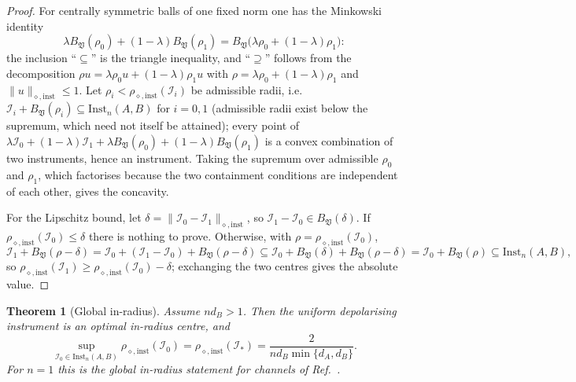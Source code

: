 \documentclass[11pt,a4paper]{article}
\newtheorem{theorem}{Theorem}[section]
\newcommand{\Inst}{\mathrm{Inst}}
\begin{document}
\begin{proof}
For centrally symmetric balls of one fixed norm one has the Minkowski identity
\[
\lambda B_{\mathfrak V}(\rho_0)+(1-\lambda)B_{\mathfrak V}(\rho_1)
=B_{\mathfrak V}\big(\lambda\rho_0+(1-\lambda)\rho_1\big):
\]
the inclusion ``$\subseteq$'' is the triangle inequality, and ``$\supseteq$'' follows from the decomposition $\rho u=\lambda\rho_0u+(1-\lambda)\rho_1u$ with $\rho=\lambda\rho_0+(1-\lambda)\rho_1$ and $\|u\|_{\diamond,\mathrm{inst}}\le1$. Let $\rho_i<\rho_{\diamond,\mathrm{inst}}(\mathcal I_i)$ be admissible radii, i.e.\ $\mathcal I_i+B_{\mathfrak V}(\rho_i)\subseteq\Inst_n(A,B)$ for $i=0,1$ (admissible radii exist below the supremum, which need not itself be attained); every point of $\lambda\mathcal I_0+(1-\lambda)\mathcal I_1+\lambda B_{\mathfrak V}(\rho_0)+(1-\lambda)B_{\mathfrak V}(\rho_1)$ is a convex combination of two instruments, hence an instrument. Taking the supremum over admissible $\rho_0$ and $\rho_1$, which factorises because the two containment conditions are independent of each other, gives the concavity.

For the Lipschitz bound, let $\delta=\|\mathcal I_0-\mathcal I_1\|_{\diamond,\mathrm{inst}}$, so $\mathcal I_1-\mathcal I_0\in B_{\mathfrak V}(\delta)$. If $\rho_{\diamond,\mathrm{inst}}(\mathcal I_0)\le\delta$ there is nothing to prove. Otherwise, with $\rho=\rho_{\diamond,\mathrm{inst}}(\mathcal I_0)$,
\[
\mathcal I_1+B_{\mathfrak V}(\rho-\delta)
=\mathcal I_0+(\mathcal I_1-\mathcal I_0)+B_{\mathfrak V}(\rho-\delta)
\subseteq\mathcal I_0+B_{\mathfrak V}(\delta)+B_{\mathfrak V}(\rho-\delta)
=\mathcal I_0+B_{\mathfrak V}(\rho)
\subseteq\Inst_n(A,B),
\]
so $\rho_{\diamond,\mathrm{inst}}(\mathcal I_1)\ge\rho_{\diamond,\mathrm{inst}}(\mathcal I_0)-\delta$; exchanging the two centres gives the absolute value.
\end{proof}

\begin{theorem}[Global in-radius]
\label{thm:global-inradius}
Assume $nd_B>1$. Then the uniform depolarising instrument is an optimal in-radius centre, and
\[
\sup_{\mathcal I_0\in\Inst_n(A,B)}\rho_{\diamond,\mathrm{inst}}(\mathcal I_0)
=\rho_{\diamond,\mathrm{inst}}(\mathcal I_*)
=\frac{2}{nd_B\min\{d_A,d_B\}}.
\]
For $n=1$ this is the global in-radius statement for channels of Ref.~\cite{CompanionChannels}.
\end{theorem}
\end{document}
